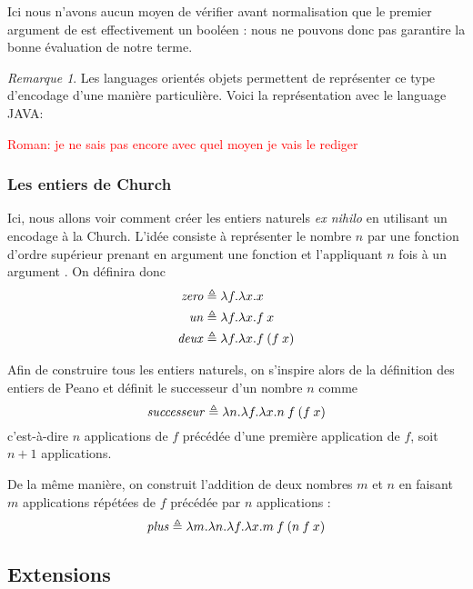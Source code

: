 \documentclass {article}
\theoremstyle{definition}
\theoremstyle{remark}
\newtheorem{remark}{Remarque}
\newcommand{\todo}[1]{\textcolor{red}{#1}}
\begin{document}
Ici nous n'avons aucun moyen de vérifier avant normalisation que le
premier argument de \Ifte{} est effectivement un booléen : nous ne
pouvons donc pas garantire la bonne évaluation de notre terme.

\begin{remark}
  Les languages orientés objets permettent de représenter ce type d'encodage d'une manière particulière.
  Voici la représentation avec le language JAVA:

  \todo{Roman: je ne sais pas encore avec quel moyen je vais le rediger}
\end{remark}


\subsubsection{Les entiers de Church}

\newcommand{\Zero}{\mathit{zero}}
\newcommand{\Un}{\mathit{un}}
\newcommand{\Deux}{\mathit{deux}}
\newcommand{\Succ}{\mathit{successeur}}
\newcommand{\Plus}{\mathit{plus}}


Ici, nous allons voir comment créer les entiers naturels \textit{ex
  nihilo} en utilisant un encodage à la Church. L'idée consiste à
représenter le nombre \(n\) par une fonction d'ordre supérieur prenant
en argument une fonction  et l'appliquant \(n\) fois à un
argument . On définira donc
%
\begin{align*}
\Zero &\triangleq \Lam{f}{\Lam{x}{x}}\\ 
\Un   &\triangleq \Lam{f}{\Lam{x}{\App{f}{x}}} \\
\Deux &\triangleq \Lam{f}{\Lam{x}{\App{f}{(\App{f}{x}})}}
\end{align*}

Afin de construire tous les entiers naturels, on s'inspire alors de la
définition des entiers de Peano et définit le successeur d'un nombre \(n\)
comme
%
\[
\Succ \triangleq \Lam{n}{\Lam{f}{\Lam{x}{\App{\App{n}{f}}{(\App{f}{x})}}}}
\]
%
c'est-à-dire \(n\) applications de \(f\) précédée d'une première
application de \(f\), soit \(n+1\) applications.

De la même manière, on construit l'addition de deux nombres \(m\) et
\(n\) en faisant \(m\) applications répétées de \(f\) précédée par
\(n\) applications :
%
\[
\Plus \triangleq \Lam{m}{\Lam{n}{\Lam{f}{\Lam{x}{\App{\App{m}{f}}{(\App{\App{n}{f}}{x}})}}}}
\]


\subsection{Extensions}
\end{document}
